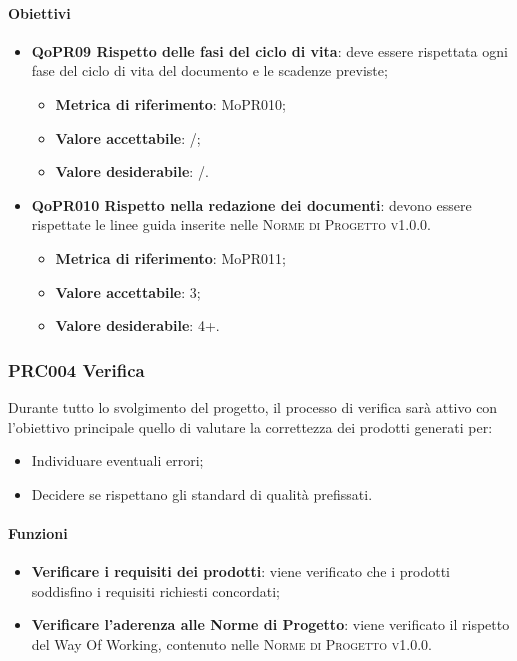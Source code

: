 \documentclass[../piano-di-qualifica.tex]{subfiles}
\begin{document}
\paragraph{Obiettivi}
\label{sub:obiettivi_3}
\begin{itemize}
    \item \textbf{QoPR09 Rispetto delle fasi del ciclo di vita}: deve essere rispettata ogni fase del ciclo di vita del documento e le scadenze previste;
        \begin{itemize}
            \item \textbf{Metrica di riferimento}: MoPR010;
            \item \textbf{Valore accettabile}: /; %
            \item \textbf{Valore desiderabile}: /.
        \end{itemize}
    \item \textbf{QoPR010 Rispetto nella redazione dei documenti}: devono essere rispettate le linee guida inserite nelle \textsc{Norme di Progetto v1.0.0}.
        \begin{itemize}
            \item \textbf{Metrica di riferimento}: MoPR011;
            \item \textbf{Valore accettabile}: 3; %
            \item \textbf{Valore desiderabile}: 4+.
        \end{itemize}
\end{itemize}

\subsubsection{PRC004 Verifica}
\label{sub:produzione_dei_documenti}
Durante tutto lo svolgimento del progetto, il processo di verifica sarà attivo con l'obiettivo principale quello di valutare la correttezza dei prodotti generati per: 
\begin{itemize}
    \item Individuare eventuali errori;
    \item Decidere se rispettano gli standard di qualità prefissati.
\end{itemize}

\paragraph{Funzioni}
\label{sub:funzioni_4}
\begin{itemize}
    \item \textbf{Verificare i requisiti dei prodotti}: viene verificato che i prodotti soddisfino i requisiti richiesti concordati;
    \item \textbf{Verificare l'aderenza alle Norme di Progetto}: viene verificato il rispetto del Way Of Working, contenuto nelle \textsc{Norme di Progetto v1.0.0}.
\end{itemize}
\end{document}
